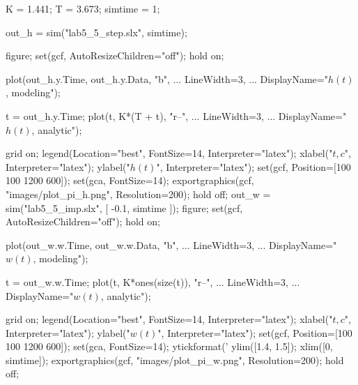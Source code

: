 \begin{matlabcode}
K = 1.441;
T = 3.673;
simtime = 1;

out_h = sim("lab5_5_step.slx", simtime);

figure;
set(gcf, AutoResizeChildren="off");
hold on;

plot(out_h.y.Time, out_h.y.Data, "b", ...
     LineWidth=3, ...
     DisplayName="$h(t)$, modeling");

t = out_h.y.Time;
plot(t, K*(T + t), "r--", ...
     LineWidth=3, ...
     DisplayName="$h(t)$, analytic");

grid on;
legend(Location="best", FontSize=14, Interpreter="latex");
xlabel("$t, c$", Interpreter="latex");
ylabel("$h(t)$", Interpreter="latex");
set(gcf, Position=[100 100 1200 600]);
set(gca, FontSize=14);
exportgraphics(gcf, "images/plot_pi_h.png", Resolution=200);
hold off;
out_w = sim("lab5_5_imp.slx", [ -0.1, simtime ]);
figure;
set(gcf, AutoResizeChildren="off");
hold on;

plot(out_w.w.Time, out_w.w.Data, "b", ...
     LineWidth=3, ...
     DisplayName="$w(t)$, modeling");

t = out_w.w.Time;
plot(t, K*ones(size(t)), "r--", ...
     LineWidth=3, ...
     DisplayName="$w(t)$, analytic");

grid on;
legend(Location="best", FontSize=14, Interpreter="latex");
xlabel("$t, c$", Interpreter="latex");
ylabel("$w(t)$", Interpreter="latex");
set(gcf, Position=[100 100 1200 600]);
set(gca, FontSize=14);
ytickformat('%
ylim([1.4, 1.5]);
xlim([0, simtime]);
exportgraphics(gcf, "images/plot_pi_w.png", Resolution=200);
hold off;
\end{matlabcode}


